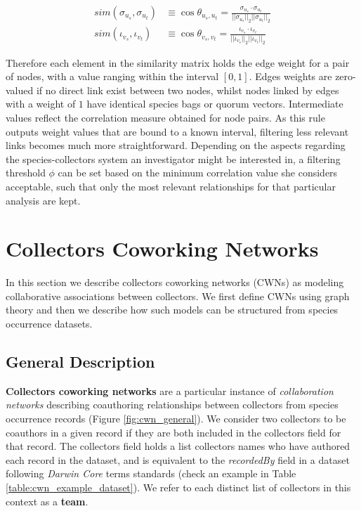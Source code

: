 {\begin{equation}
\label{equation:cosine_similarity}
\begin{split}
sim(\sigma_{u_s},\sigma_{u_t}) &\equiv
\cos \theta_{u_s,u_t} =
\frac{  \sigma_{u_s} \cdot \sigma_{u_t}  }{  ||\sigma_{u_s}||_2  ||\sigma_{u_t}||_2  } \\
sim(\iota_{v_s},\iota_{v_t}) &\equiv
\cos \theta_{v_s,v_t} =
\frac{  \iota_{v_s} \cdot \iota_{v_t}  }{  ||\iota_{v_s}||_2  ||\iota_{v_t}||_2  } 
\end{split}
\end{equation}

Therefore each element in the similarity matrix holds the edge weight for a pair of nodes, with a value ranging within the interval $[0,1]$. Edges weights are zero-valued if no direct link exist between two nodes,  whilst nodes linked by edges with a weight of $1$ have identical species bags or quorum vectors. Intermediate values reflect the correlation measure obtained for node pairs.
As this rule outputs weight values that are bound to a known interval, filtering less relevant links becomes much more straightforward. Depending on the aspects regarding the species-collectors system an investigator might be interested in, a filtering threshold $\phi$ can be set based on the minimum correlation value she considers acceptable, such that only the most relevant relationships for that particular analysis are kept.













\section{Collectors Coworking Networks}
In this section we describe collectors coworking networks (CWNs) as modeling collaborative associations between collectors.
We first define CWNs using graph theory and then we describe how such models can be structured from species occurrence datasets.

\subsection{General Description}
\textbf{Collectors coworking networks} are a particular instance of \textit{collaboration networks} describing coauthoring relationships between collectors from species occurrence records (Figure \ref{fig:cwn_general}).
We consider two collectors to be coauthors in a given record if they are both included in the collectors field for that record. The collectors field holds a list collectors names who have authored each record in the dataset, and is equivalent to the \textit{recordedBy} field in a dataset following \textit{Darwin Core} terms standards (check an example in Table \ref{table:cwn_example_dataset}). We refer to each distinct list of collectors in this context as a \textbf{team}.

}
